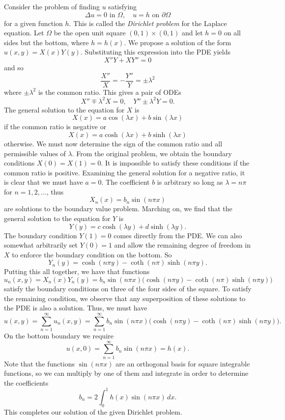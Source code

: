 \begin{example}

Consider the problem of finding $u$ satisfying
\[
\Delta u = 0 \text{ in $\Omega$}, \quad
u = h \text{ on $\partial \Omega$}
\]
for a given function $h$. This is called the \emph{Dirichlet problem} for the Laplace equation. Let $\Omega$ be the open unit square $(0,1) \times (0,1)$ and let $h = 0$ on all sides but the bottom, where $h = h(x)$. We propose a solution of the form $u(x,y) = X(x) Y(y)$. Substituting this expression into the PDE yields
\[X''Y + XY'' = 0\]
and so
\[\frac{X''}{X} = -\frac{Y''}{Y} = \pm\lambda^2\]
where $\pm\lambda^2$ is the common ratio. This gives a pair of ODEs
\[
X''\mp\lambda^2 X = 0, \quad
Y''\pm\lambda^2 Y = 0.
\]
The general solution to the equation for $X$ is \[X(x) = a \cos(\lambda x) + b \sin(\lambda x)\] if the common ratio is negative or \[X(x) = a \cosh(\lambda x) + b \sinh(\lambda x)\] otherwise. We must now determine the sign of the common ratio and all permissible values of $\lambda$. From the original problem, we obtain the boundary conditions $X(0) = X(1) = 0$. It is impossible to satisfy these conditions if the common ratio is positive. Examining the general solution for a negative ratio, it is clear that we must have $a = 0$. The coefficient $b$ is arbitrary so long as $\lambda = n\pi$ for $n = 1,2,\dots$, thus
\[X_n(x) = b_n \sin(n\pi x)\]
are solutions to the boundary value problem. Marching on, we find that the general solution to the equation for $Y$ is
\[Y(y) = c \cosh(\lambda y) + d \sinh(\lambda y).\]
The boundary condition $Y(1) = 0$ comes directly from the PDE. We can also somewhat arbitrarily set $Y(0) = 1$ and allow the remaining degree of freedom in $X$ to enforce the boundary condition on the bottom. So
\[Y_n(y) = \cosh(n \pi y) - \coth(n \pi)\sinh(n \pi y) .\]
Putting this all together, we have that functions
\[
u_n(x,y) = X_n(x)Y_n(y) = b_n \sin(n\pi x)\bigl(\cosh(n \pi y) - \coth(n \pi)\sinh(n \pi y)\bigr)
\]
satisfy the boundary conditions on three of the four sides of the square. To satisfy the remaining condition, we observe that any superposition of these solutions to the PDE is also a solution. Thus, we must have
\[u(x,y) = \sum_{n = 1}^\infty u_n(x,y) = \sum_{n = 1}^\infty b_n \sin(n\pi x)\bigl(\cosh(n \pi y) - \coth(n \pi)\sinh(n \pi y)\bigr).\]
On the bottom boundary we require
\[u(x,0) = \sum_{n = 1}^\infty b_n \sin(n\pi x) = h(x) .\]
Note that the functions $\sin(n \pi x)$ are an orthogonal basis for square integrable functions, so we can multiply by one of them and integrate in order to determine the coefficients
\[b_n = 2\int_0^1 h(x)\sin(n\pi x)\,dx .\]
This completes our solution of the given Dirichlet problem.
\end{example}

